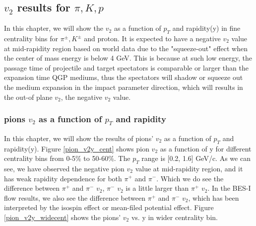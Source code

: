 \clearpage
\subsection{$v_{2}$ results for $\pi, K, p$}
In this chapter, we will show the $v_{2}$ as a function of $p_{T}$ and rapidity(y) in fine centrality bins for $\pi^{\pm}, K^{\pm}$ and proton. It is expected to have a negative $v_{2}$ value at mid-rapidity region based on world data due to the "squeeze-out" effect when the center of mass energy is below 4 GeV. This is because at such low energy, the passage time of projectile and target spectators is comparable or larger than the expansion time QGP mediums, thus the spectators will shadow or squeeze out the medium expansion in the impact parameter direction, which will results in the out-of plane $v_{2}$, the negative $v_{2}$ value.

\subsubsection{pions $v_{2}$ as a function of $p_{T}$ and rapidity}
In this chapter, we will show the results of pions' $v_{2}$ as a function of $p_{T}$ and rapidity(y).
Figure \ref{pion_v2y_cent} shows pion $v_{2}$ as a function of y for different centrality bins from 0-5\% to 50-60\%. The $p_{T}$ range is [0.2, 1.6] GeV/c. As we can see, we have observed the negative pion $v_{2}$ value at mid-rapidity region, and it has weak rapidity dependence for both $\pi^{+}$ and $\pi^{-}$. Which we do see the difference between $\pi^{+}$ and $\pi^{-}$ $v_{2}$, $\pi^{-}$ $v_{2}$ is a little larger than $\pi^{+}$ $v_{2}$. In the BES-I flow results, we also see the difference between $\pi^{+}$ and $\pi^{-}$ $v_{2}$, which has been interpreted by the isospin effect or mean-filed potential effect. Figure \ref{pion_v2y_widecent} shows the pions' $v_{2}$ vs. y in wider centrality bin.

